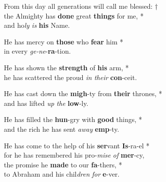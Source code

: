 

From this day all generations will call me blessed: †\\
the Almighty has \textbf{done} great \textbf{things} for me, *\\
and ho\emph{ly} \emph{is} \textbf{his} Name.

He has mercy on \textbf{those} who \textbf{fear} him *\\
in every \emph{ge-ne}-\textbf{ra}-tion.

He has shown the \textbf{strength} of \textbf{his} arm, *\\
he has scattered the proud \emph{in their} \textbf{con}-ceit.

He has cast down the \textbf{migh}-ty from \textbf{their} thrones, *\\
and has lifted \emph{up the} \textbf{low}-ly.

He has filled the \textbf{hun}-gry with \textbf{good} things, *\\
and the rich he has sent \emph{away} \textbf{emp}-ty.

He has come to the help of his \textbf{ser}vant \textbf{Is}-ra-el *\\
for he has remembered his pro-\emph{mise} \emph{of} \textbf{mer}-cy,\\
the promise he \textbf{made} to our \textbf{fa}-thers, *\\
to Abraham and his chil\emph{dren} \emph{for} \textbf{e}-ver.

